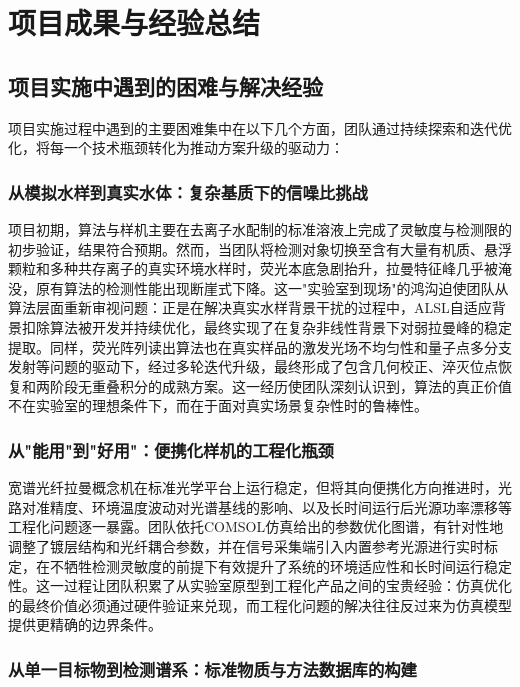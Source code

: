 \documentclass[12pt,a4paper]{article}
\begin{document}
\section{项目成果与经验总结}

\subsection{项目实施中遇到的困难与解决经验}

项目实施过程中遇到的主要困难集中在以下几个方面，团队通过持续探索和迭代优化，将每一个技术瓶颈转化为推动方案升级的驱动力：

\subsubsection{从模拟水样到真实水体：复杂基质下的信噪比挑战}

项目初期，算法与样机主要在去离子水配制的标准溶液上完成了灵敏度与检测限的初步验证，结果符合预期。然而，当团队将检测对象切换至含有大量有机质、悬浮颗粒和多种共存离子的真实环境水样时，荧光本底急剧抬升，拉曼特征峰几乎被淹没，原有算法的检测性能出现断崖式下降。这一"实验室到现场"的鸿沟迫使团队从算法层面重新审视问题：正是在解决真实水样背景干扰的过程中，ALSL自适应背景扣除算法被开发并持续优化，最终实现了在复杂非线性背景下对弱拉曼峰的稳定提取。同样，荧光阵列读出算法也在真实样品的激发光场不均匀性和量子点多分支发射等问题的驱动下，经过多轮迭代升级，最终形成了包含几何校正、淬灭位点恢复和两阶段无重叠积分的成熟方案。这一经历使团队深刻认识到，算法的真正价值不在实验室的理想条件下，而在于面对真实场景复杂性时的鲁棒性。

\subsubsection{从"能用"到"好用"：便携化样机的工程化瓶颈}

宽谱光纤拉曼概念机在标准光学平台上运行稳定，但将其向便携化方向推进时，光路对准精度、环境温度波动对光谱基线的影响、以及长时间运行后光源功率漂移等工程化问题逐一暴露。团队依托COMSOL仿真给出的参数优化图谱，有针对性地调整了镀层结构和光纤耦合参数，并在信号采集端引入内置参考光源进行实时标定，在不牺牲检测灵敏度的前提下有效提升了系统的环境适应性和长时间运行稳定性。这一过程让团队积累了从实验室原型到工程化产品之间的宝贵经验：仿真优化的最终价值必须通过硬件验证来兑现，而工程化问题的解决往往反过来为仿真模型提供更精确的边界条件。

\subsubsection{从单一目标物到检测谱系：标准物质与方法数据库的构建}
\end{document}
